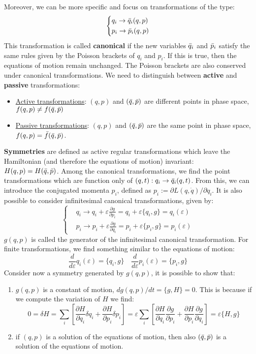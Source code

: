 \documentclass[../main.tex]{subfiles}
\begin{document}
Moreover, we can be more specific and focus on transformations of the type:
\[
\left\{
\begin{aligned}
&q_i\to\Bar{q}_i(q,p)\\
&p_i\to\Bar{p}_i(q,p)
\end{aligned}
\right.
\]
This transformation is called \textbf{canonical} if the new variables $\Bar{q}_i$ and $\Bar{p}_i$ satisfy the same rules given by the Poisson brackets of $q_i$ and $p_i$. If this is true, then the equations of motion remain unchanged. The Poisson brackets are also conserved under canonical transformations. We need to distinguish between \textbf{active} and \textbf{passive} transformations:
\begin{itemize}
    \item \underline{Active transformations}: $(q,p)$ and $(\Bar{q},\Bar{p})$ are different points in phase space, $f(q,p)\neq f(\Bar{q},\Bar{p})$
    \item \underline{Passive transformations}: $(q,p)$ and $(\Bar{q},\Bar{p})$ are the same point in phase space, $f(q,p)=\Bar{f}(\Bar{q},\Bar{p})$.
\end{itemize}
\textbf{Symmetries} are defined as active regular transformations which leave the Hamiltonian (and therefore the equations of motion) invariant:\\
$H(q,p)=H(\Bar{q},\Bar{p})$. Among the canonical transformations, we find the point transformations which are function only of $(q,t): q_i\to\Bar{q}_i(q,t)$. From this, we can introduce the conjugated momenta $p_i$, defined as $p_i:=\partial L(q,\Dot{q})/\partial q_i$. It is also possible to consider infinitesimal canonical transformations, given by:
\[
\left\{
\begin{aligned}
&q_i\to q_i+\varepsilon\frac{\partial g}{\partial p_i}=q_i+\varepsilon\{q_i,g\}=q_i(\varepsilon)\\
&p_i\to p_i+\varepsilon\frac{\partial g}{\partial q_i}=p_i+\varepsilon\{p_i,g\}=p_i(\varepsilon)
\end{aligned}
\right.
\]
$g(q,p)$ is called the generator of the infinitesimal canonical transformation. For finite transformations, we find something similar to the equations of motion:
\[
\frac{d}{d\varepsilon}q_i(\varepsilon)=\{q_i,g\} \quad \frac{d}{d\varepsilon}p_i(\varepsilon)=\{p_i,g\}
\]
Consider now a symmetry generated by $g(q,p)$, it is possible to show that:
\begin{enumerate}
    \item $g(q,p)$ is a constant of motion, $dg(q,p)/dt=\{g,H\}=0$. This is because if we compute the variation of $H$ we find:
    \[
    0=\delta H=\sum_i\left[\frac{\partial H}{\partial q_i}\delta q_i+\frac{\partial H}{\partial p_i}\delta p_i\right]=\varepsilon\sum_i\left[\frac{\partial H}{\partial q_i}\frac{\partial g}{\partial p_i}+\frac{\partial H}{\partial p_i}\frac{\partial g}{\partial q_i}\right]=\varepsilon\{H,g\}
    \]
    \item if $(q,p)$ is a solution of the equations of motion, then also $(\Bar{q},\Bar{p})$ is a solution of the equations of motion.
\end{enumerate}
\end{document}
